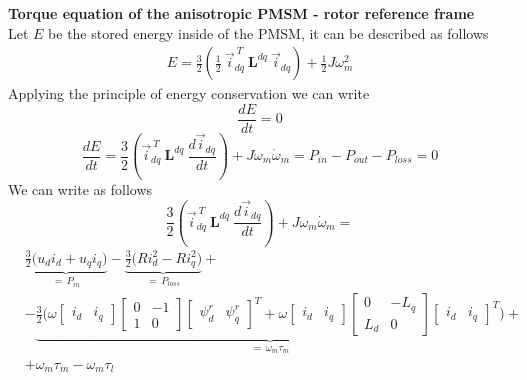 \documentclass[12pt,a4paper,oneside]{book}
\begin{document}
\begin{onehalfspace}
\textbf{Torque equation of the anisotropic PMSM - rotor reference frame}\\
Let $E$ be the stored energy inside of the PMSM, it can be described as 
follows
\begin{equation*}
	\begin{aligned}
		E = \frac{3}{2} \left(\frac{1}{2}\ \vec{i}_{dq}^{\ T}\ 
		\mathbf{L}^{dq}\ \vec{i}_{dq}\right) +\frac{1}{2}J\omega_m^2
	\end{aligned} 
\end{equation*}
Applying the principle of energy conservation we can write
\begin{equation*}
	\frac{dE}{dt} = 0
\end{equation*}
\begin{equation*}
	\frac{dE}{dt} = \frac{3}{2} \left( \vec{i}_{dq}^{\ T}\ \mathbf{L}^{dq}\ 
	\frac{d\vec{i}_{dq}}{dt}\right) + J\omega_m\dot{\omega}_m= 
	P_{in}-P_{out}-P_{loss} = 0
\end{equation*}
We can write as follows
\begin{equation*}
	\frac{3}{2} \left( \vec{i}_{dq}^{\ T}\ \mathbf{L}^{dq}\ 
	\frac{d\vec{i}_{dq}}{dt}\right) + J\omega_m\dot{\omega}_m =
\end{equation*}
\begin{equation*}
	\begin{aligned}
		&\underbrace{\frac{3}{2}\Big(u_d i_d+u_q 
			i_q\Big)}_{=\,P_{in}}-\underbrace{\frac{3}{2}\Big(Ri_d^2-Ri_q^2\Big)}_{=\,P_{loss}}
		+ \\[6pt]
		&-\underbrace{\frac{3}{2}\Big(\omega 
			\begin{bmatrix} i_d & i_q \end{bmatrix}
			\begin{bmatrix} 0 & -1 \\ 1 & 0\end{bmatrix}
			\begin{bmatrix} \psi^r_d & \psi^r_q \end{bmatrix}^T
			+\omega 
			\begin{bmatrix} i_d & i_q \end{bmatrix}
			\begin{bmatrix} 0 & -L_q \\ L_d & 0\end{bmatrix}
			\begin{bmatrix} i_d & i_q \end{bmatrix}^T\Big)
		}_{=\,\omega_m\tau_m} + \\[6pt]
		& +\omega_m\tau_m-\omega_m\tau_l
	\end{aligned}

\end{equation*}
\end{onehalfspace}
\end{document}
